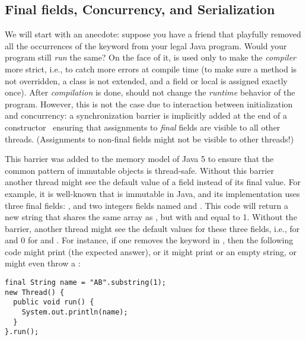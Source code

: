 \subsection{Final fields, Concurrency, and Serialization}
\label{Section:FinalFields}
We will start with an anecdote:
    suppose you have a friend that
    playfully removed all the occurrences of the  keyword
    from your legal Java program.
Would your program still \emph{run} the same?
On the face of it,  is used only to make the \emph{compiler} more {strict},
    i.e., to catch more errors at compile time
    (to make sure a method is not overridden, a class is not extended, and a field or local
        is assigned exactly once).
After \emph{compilation} is done,  should not change the \emph{runtime} behavior of the program.
However, this is not the case due to interaction between initialization and concurrency:
    a synchronization barrier is implicitly added
    at the end of a constructor~\cite{JSR133}
    ensuring that assignments to \emph{final} fields are visible to all other threads.
(Assignments to non-final fields might not be visible to other threads!)

This barrier was added to the memory model of Java 5
    to ensure that the common pattern of immutable objects is thread-safe.
Without this barrier another thread might see the default value of a field
    instead of its final value.
For example, it is well-known that  is immutable in Java,
    and its implementation uses three {final} fields:
    , and two integers fields named  and .
This code  will return a new string 
    that shares
    the same  array as , %
    but with  and  equal to 1.
Without the barrier, %
    another thread might see the default values for these three fields,
    i.e.,  for  and 0 for  and .
For instance,
    if one removes the  keyword in ,
    then
    the following code might print  (the expected answer),
    or it might print
     or an empty string,
    or might even throw a :
\begin{lstlisting}
final String name = "AB".substring(1);
new Thread() {
  public void run() {
    System.out.println(name);
  }
}.run();
\end{lstlisting}

